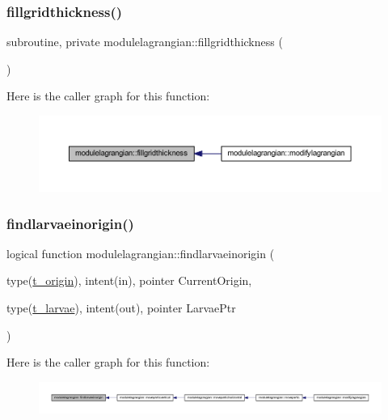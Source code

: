 \subsubsection{\texorpdfstring{fillgridthickness()}{fillgridthickness()}}
{\footnotesize\ttfamily subroutine, private modulelagrangian\+::fillgridthickness (\begin{DoxyParamCaption}{ }\end{DoxyParamCaption})\hspace{0.3cm}{\ttfamily [private]}}

Here is the caller graph for this function\+:\nopagebreak
\begin{figure}[H]
\begin{center}
\leavevmode
\includegraphics[width=350pt]{namespacemodulelagrangian_a8232b9379a8d2919b7885bb92a286601_icgraph}
\end{center}
\end{figure}
\mbox{\label{namespacemodulelagrangian_a4a81291f0f83c4c244a6842be5d88471}} 
\subsubsection{\texorpdfstring{findlarvaeinorigin()}{findlarvaeinorigin()}}
{\footnotesize\ttfamily logical function modulelagrangian\+::findlarvaeinorigin (\begin{DoxyParamCaption}\item[{type(\mbox{\hyperlink{structmodulelagrangian_1_1t__origin}{t\+\_\+origin}}), intent(in), pointer}]{Current\+Origin,  }\item[{type(\mbox{\hyperlink{structmodulelagrangian_1_1t__larvae}{t\+\_\+larvae}}), intent(out), pointer}]{Larvae\+Ptr }\end{DoxyParamCaption})\hspace{0.3cm}{\ttfamily [private]}}

Here is the caller graph for this function\+:\nopagebreak
\begin{figure}[H]
\begin{center}
\leavevmode
\includegraphics[width=350pt]{namespacemodulelagrangian_a4a81291f0f83c4c244a6842be5d88471_icgraph}
\end{center}
\end{figure}
\mbox{\label{namespacemodulelagrangian_ad718f547ef233587149bd01b55f9e9dd}} 
